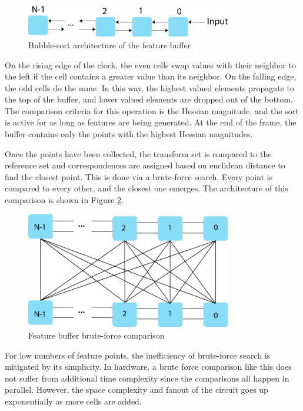 \documentclass[sigconf]{acmart/acmart}
\begin{document}
\begin{figure}[h]
	\centering
	\includegraphics[width=0.8\textwidth]{figures/block/bubblesort}
	\caption{Bubble-sort architecture of the feature buffer}
	\label{fig_bubblesort}
\end{figure}

On the rising edge of the clock, the even cells swap values with their neighbor to the left if the cell contains a greater value than its neighbor. On the falling edge, the odd cells do the same. In this way, the highest valued elements propagate to the top of the buffer, and lower valued elements are dropped out of the bottom. The comparison criteria for this operation is the Hessian magnitude, and the sort is active for as long as features are being generated. At the end of the frame, the buffer contains only the points with the highest Hessian magnitudes.

Once the points have been collected, the transform set is compared to the reference set and correspondences are assigned based on euclidean distance to find the closest point. This is done via a brute-force search. Every point is compared to every other, and the closest one emerges. The architecture of this comparison is shown in Figure \ref{fig_comparison}.

\begin{figure}[h]
	\centering
	\includegraphics[width=0.8\textwidth]{figures/block/comparison}
	\caption{Feature buffer brute-force comparison}
	\label{fig_comparison}
\end{figure}

For low numbers of feature points, the inefficiency of brute-force search is mitigated by its simplicity. In hardware, a brute force comparison like this does not suffer from additional time complexity since the comparisons all happen in parallel. However, the space complexity and fanout of the circuit goes up exponentially as more cells are added.
\end{document}
